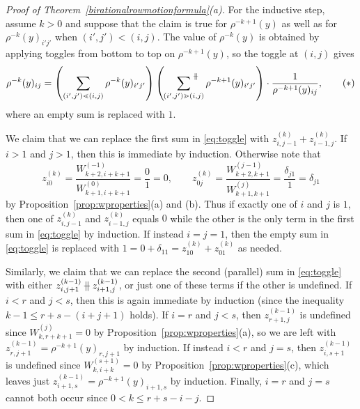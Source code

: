 \documentclass[ALCO,Unicode,published]{cedram}
\numberwithin{equation}{section}
\newcommand{\parallelsum}{\:\ \mathclap{\|}\mathclap{-}\ \:}
\begin{document}
\begin{proof}[Proof of Theorem~\ref{birationalrowmotionformula}(a)]
For the inductive step, assume $k > 0$ and suppose that the claim is true for $\rho^{-k+1}(y)$ as well as for $\rho^{-k}(y)_{i'j'}$ when $(i',j') < (i,j)$. The value of $\rho^{-k}(y)$ is obtained by applying toggles from bottom to top on $\rho^{-k+1}(y)$, so the toggle at $(i,j)$ gives
\[\rho^{-k}(y)_{ij} = \left(\sum_{(i',j')\lessdot (i,j)} \rho^{-k}(y)_{i'j'}\right)\left(\;\;\;\sideset{}{^{\parallelsum}}\sum_{(i',j') \gtrdot (i,j)}\rho^{-k+1}(y)_{i'j'}\right) \cdot \frac{1}{\rho^{-k+1}(y)_{ij}}, \tag{$*$} \label{eq:toggle}\]
where an empty sum is replaced with $1$. 

We claim that we can replace the first sum in \eqref{eq:toggle} with $z_{i,j-1}^{(k)}+z_{i-1,j}^{(k)}$. If $i > 1$ and $j > 1$, then this is immediate by induction. Otherwise note that
\[
    z_{i0}^{(k)} = \frac{W_{k+2,i+k+1}^{(-1)}}{W_{k+1,i+k+1}^{(0)}} = \frac01= 0,\qquad
    z_{0j}^{(k)} = \frac{W_{k+2,k+1}^{(j-1)}}{W_{k+1,k+1}^{(j)}} = \frac{\delta_{j1}}{1} = \delta_{j1}
\]
by Proposition~\ref{prop:wproperties}(a) and (b).
Thus if exactly one of $i$ and $j$ is $1$, then one of $z_{i,j-1}^{(k)}$ and $z_{i-1,j}^{(k)}$ equals $0$ while the other is the only term in the first sum in \eqref{eq:toggle} by induction. If instead $i=j=1$, then the empty sum in \eqref{eq:toggle} is replaced with $1=0 + \delta_{11} = z_{10}^{(k)} + z_{01}^{(k)}$ as needed.

Similarly, we claim that we can replace the second (parallel) sum in \eqref{eq:toggle} with either $z_{i,j+1}^{(k-1)} \parallelsum z_{i+1,j}^{(k-1)}$, or just one of these terms if the other is undefined. If $i < r$ and $j < s$, then this is again immediate by induction (since the inequality $k-1 \leq r+s-(i+j+1)$ holds). If $i=r$ and $j < s$, then $z_{r+1,j}^{(k-1)}$ is undefined since $W_{k,r+k+1}^{(j)}=0$ by Proposition~\ref{prop:wproperties}(a), so we are left with $z_{r,j+1}^{(k-1)} = \rho^{-k+1}(y)_{r,j+1}$ by induction. If instead $i < r$ and $j=s$, then $z_{i,s+1}^{(k-1)}$ is undefined since $W_{k,i+k}^{(s+1)} = 0$ by Proposition~\ref{prop:wproperties}(c), which leaves just $z_{i+1,s}^{(k-1)} = \rho^{-k+1}(y)_{i+1,s}$ by induction. Finally, $i=r$ and $j=s$ cannot both occur since $0 < k \leq r+s-i-j$.


\end{proof}
\end{document}
